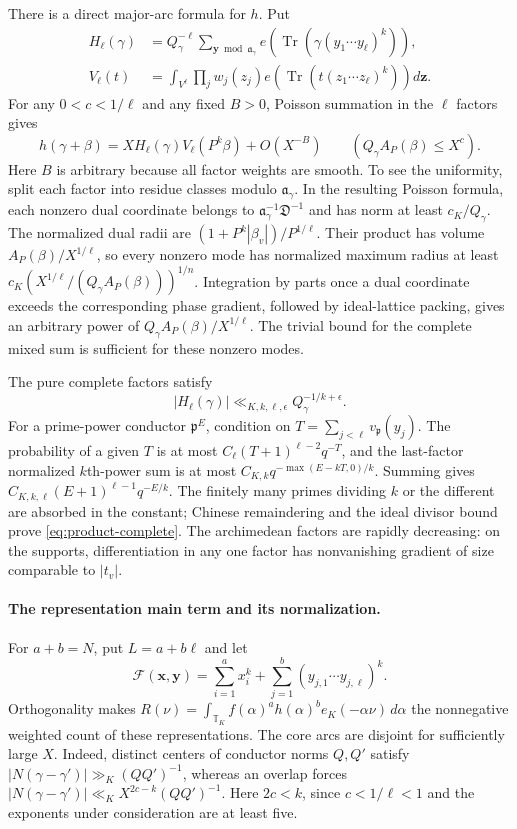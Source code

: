 \documentclass[11pt,reqno]{amsart}
\numberwithin{equation}{section}
\theoremstyle{definition}
\begin{document}
There is a direct major-arc formula for $h$.  Put
\begin{align*}
 H_\ell(\gamma)&=Q_\gamma^{-\ell}
 \sum_{\mathbf y\bmod\mathfrak a_\gamma}
 e\!\left(\operatorname {Tr}(\gamma(y_1\cdots y_\ell)^k)\right),\\
 V_\ell(t)&=\int_{V^\ell}\prod_j w_j(z_j)
 e\!\left(\operatorname {Tr}(t(z_1\cdots z_\ell)^k)\right)d\mathbf z.
\end{align*}
For any $0<c<1/\ell$ and any fixed $B>0$, Poisson summation in the $\ell$ factors gives
\begin{equation}\label{eq:product-core}
 h(\gamma+\beta)=XH_\ell(\gamma)V_\ell(P^k\beta)+O(X^{-B})
 \qquad(Q_\gamma A_P(\beta)\le X^c).
\end{equation}
Here $B$ is arbitrary because all factor weights are smooth.  To see the uniformity,
split each factor into residue classes modulo $\mathfrak a_\gamma$.
In the resulting Poisson formula, each nonzero dual coordinate belongs to
$\mathfrak a_\gamma^{-1}\mathfrak D^{-1}$ and has norm at least $c_K/Q_\gamma$.
The normalized dual radii are $(1+P^k|\beta_v|)/P^{1/\ell}$.
Their product has volume $A_P(\beta)/X^{1/\ell}$, so every nonzero mode has
normalized maximum radius at least
$c_K(X^{1/\ell}/(Q_\gamma A_P(\beta)))^{1/n}$.
Integration by parts once a dual coordinate exceeds the corresponding phase
gradient, followed by ideal-lattice packing, gives an arbitrary power of
$Q_\gamma A_P(\beta)/X^{1/\ell}$.
The trivial bound for the complete mixed sum is sufficient for these nonzero modes.

The pure complete factors satisfy
\begin{equation}\label{eq:product-complete}
 |H_\ell(\gamma)|\ll_{K,k,\ell,\epsilon}Q_\gamma^{-1/k+\epsilon}.
\end{equation}
For a prime-power conductor $\mathfrak p^E$, condition on
$T=\sum_{j<\ell}v_\mathfrak p(y_j)$.
The probability of a given $T$ is at most
$C_\ell(T+1)^{\ell-2}q^{-T}$, and the last-factor normalized $k$th-power sum
is at most $C_{K,k}q^{-\max(E-kT,0)/k}$.
Summing gives $C_{K,k,\ell}(E+1)^{\ell-1}q^{-E/k}$.
The finitely many primes dividing $k$ or the different are absorbed in the constant;
Chinese remaindering and the ideal divisor bound prove \eqref{eq:product-complete}.
The archimedean factors are rapidly decreasing: on the supports, differentiation
in any one factor has nonvanishing gradient of size comparable to $|t_v|$.

\paragraph{The representation main term and its normalization.}
For $a+b=N$, put $L=a+b\ell$ and let
\[
 \mathcal F(\mathbf x,\mathbf y)
   =\sum_{i=1}^a x_i^k+
      \sum_{j=1}^b(y_{j,1}\cdots y_{j,\ell})^k.
\]
Orthogonality makes
$R(\nu)=\int_{\mathbb T_K}f(\alpha)^ah(\alpha)^b e_K(-\alpha\nu)\,d\alpha$
the nonnegative weighted count of these representations.
The core arcs are disjoint for sufficiently large $X$.
Indeed, distinct centers of conductor norms $Q,Q'$ satisfy
$|N(\gamma-\gamma')|\gg_K(QQ')^{-1}$, whereas an overlap forces
$|N(\gamma-\gamma')|\ll_K X^{2c-k}(QQ')^{-1}$.
Here $2c<k$, since $c<1/\ell<1$ and the exponents under consideration are at least five.
\end{document}
